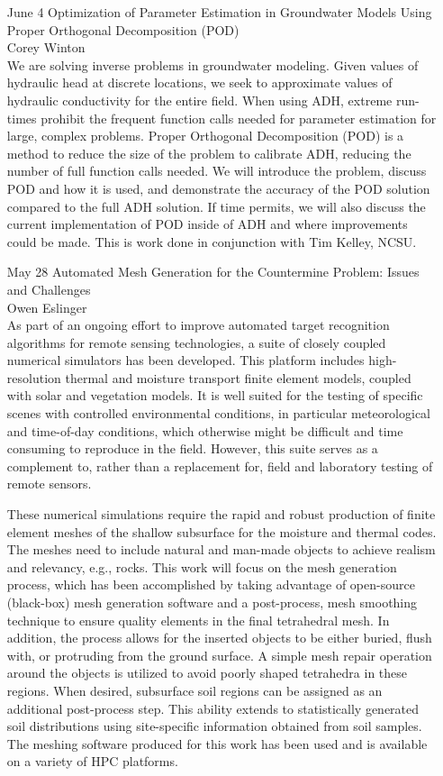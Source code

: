 \documentclass[12]{article}
\begin{document}
\begin{enumerate}
\item[June 4] Optimization of Parameter Estimation in Groundwater Models Using Proper Orthogonal Decomposition (POD)\\
  Corey Winton\\
  We are solving inverse problems in groundwater
  modeling. Given values of hydraulic head at discrete locations, we
  seek to approximate values of hydraulic conductivity for the entire
  field.  When using ADH, extreme run-times prohibit the frequent
  function calls needed for parameter estimation for large, complex
  problems. Proper Orthogonal Decomposition (POD) is a method to
  reduce the size of the problem to calibrate ADH, reducing the number
  of full function calls needed. We will introduce the problem,
  discuss POD and how it is used, and demonstrate the accuracy of the
  POD solution compared to the full ADH solution.  If time permits, we
  will also discuss the current implementation of POD inside of ADH
  and where improvements could be made.  This is work done in
  conjunction with Tim Kelley, NCSU.

\item[May 28] Automated Mesh Generation for the Countermine Problem: Issues and Challenges\\
Owen Eslinger\\
As part of an ongoing effort to improve automated target recognition
algorithms for remote sensing technologies, a suite of closely coupled
numerical simulators has been developed. This platform includes
high-resolution thermal and moisture transport finite element models,
coupled with solar and vegetation models. It is well suited for the testing
of specific scenes with controlled environmental conditions, in particular
meteorological and time-of-day conditions, which otherwise might be
difficult and time consuming to reproduce in the field. However, this suite
serves as a complement to, rather than a replacement for, field and
laboratory testing of remote sensors.

These numerical simulations require the rapid and robust production of
finite element meshes of the shallow subsurface for the moisture and thermal
codes. The meshes need to include natural and man-made objects to achieve
realism and relevancy, e.g., rocks. This work will focus on the mesh
generation process, which has been accomplished by taking advantage of
open-source (black-box) mesh generation software and a post-process, mesh
smoothing technique to ensure quality elements in the final tetrahedral
mesh. In addition, the process allows for the inserted objects to be either
buried, flush with, or protruding from the ground surface. A simple mesh
repair operation around the objects is utilized to avoid poorly shaped
tetrahedra in these regions. When desired, subsurface soil regions can be
assigned as an additional post-process step. This ability extends to
statistically generated soil distributions using site-specific information
obtained from soil samples. The meshing software produced for this work has
been used and is available on a variety of HPC platforms.


\end{enumerate}
\end{document}

